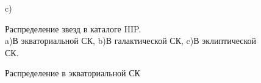 \documentclass[14pt,aspectratio=43]{beamer}
\begin{document}
\begin{frame}[<alignment>]
\begin{figure}[H]
\begin{minipage}[h]{0.47\linewidth}
\end{minipage}
\vfill
\begin{minipage}[h]{0.47\linewidth}
 c) \\
\end{minipage}
\hfill
\begin{minipage}[h]{0.47\linewidth}
Распределение звезд в каталоге HIP.\\
a)В экваториальной СК, b)В галактической СК, c)В эклиптической СК.
\end{minipage}
\label{ris:experimentalcorrelationsignals}
\end{figure}

\end{frame}	

\begin{frame}[<alignment>]
\begin{figure}[h!]
\caption{Распределение в экваториальной СК}
\label{img:hiptgasra}
\end{figure}
\end{frame}	
\end{document}
